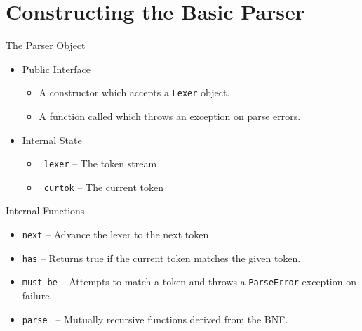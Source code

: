\documentclass[handout]{beamer}
\newenvironment{code}{%
 \VerbatimEnvironment
 \begin{adjustbox}{max width=\textwidth, max height=0.7\textheight}
 \begin{BVerbatim}
  }{
  \end{BVerbatim}
 \end{adjustbox}
}
\begin{document}
\section{Constructing the Basic Parser}
\begin{frame}{The Parser Object}
    \begin{itemize}
        \item Public Interface
        \begin{itemize}
            \item A constructor which accepts a \texttt{Lexer} object.
            \item A function called  which throws an exception on parse errors.
        \end{itemize}
        \item Internal State
        \begin{itemize}
            \item \texttt{\_lexer} -- The token stream
            \item \texttt{\_curtok} -- The current token 
        \end{itemize}
    \end{itemize}
\end{frame}


\begin{frame}{Internal Functions}
    \begin{itemize}
        \item \texttt{next} -- Advance the lexer to the next token
        \item \texttt{has} -- Returns true if the current token matches the given token.
        \item \texttt{must\_be} -- Attempts to match a token and throws a \texttt{ParseError} exception on failure.
        \item \texttt{parse\_<non-terminal>} -- Mutually recursive functions derived from the BNF.
    \end{itemize}
\end{frame}




\end{document}
